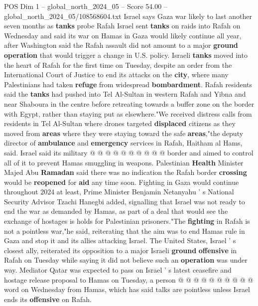 \begin{textsample}{POS Dim 1 – global\_north\_2024\_05 – Score 54.00 – global\_north\_2024\_05/108568604.txt}  \label{ex:f1_pos_271}
Israel says Gaza war likely to last another seven months as \textbf{tanks} probe Rafah Israel sent \textbf{tanks} on raids into Rafah on Wednesday and said its war on Hamas in Gaza would likely continue all year, after Washington said the Rafah assault did not amount to a major \textbf{ground} \textbf{operation} that would trigger a change in U.S. policy.
Israeli \textbf{tanks} moved into the heart of Rafah for the first time on Tuesday, despite an order from the International Court of Justice to end its attacks on the \textbf{city}, where many Palestinians had taken \textbf{refuge} from widespread \textbf{bombardment}.
Rafah residents said the \textbf{tanks} had pushed into Tel Al-Sultan in western Rafah and Yibna and near Shaboura in the centre before retreating towards a buffer zone on the border with Egypt, rather than staying put as elsewhere."We received distress calls from residents in Tel Al-Sultan where drones targeted \textbf{displaced} citizens as they moved from \textbf{areas} where they were staying toward the safe \textbf{areas},"the deputy director of \textbf{ambulance} and \textbf{emergency} services in Rafah, Haitham al Hams, said.
Israel said its military @ @ @ @ @ @ @ @ @ @ border and aimed to control all of it to prevent Hamas smuggling in weapons.
Palestinian \textbf{Health} Minister Majed Abu \textbf{Ramadan} said there was no indication the Rafah border \textbf{crossing} would be \textbf{reopened} for \textbf{aid} any time soon.
Fighting in Gaza would continue throughout 2024 at least, Prime Minister Benjamin Netanyahu ' s National Security Advisor Tzachi Hanegbi added, signalling that Israel was not ready to end the war as demanded by Hamas, as part of a deal that would see the exchange of hostages is holds for Palestinian prisoners."The \textbf{fighting} in Rafah is not a pointless war,"he said, reiterating that the aim was to end Hamas rule in Gaza and stop it and its allies attacking Israel.
The United States, Israel ' s closest ally, reiterated its opposition to a major Israeli \textbf{ground} \textbf{offensive} in Rafah on Tuesday while saying it did not believe such an \textbf{operation} was under way.
Mediator Qatar was expected to pass on Israel ' s latest ceasefire and hostage release proposal to Hamas on Tuesday, a person @ @ @ @ @ @ @ @ @ @ word on Wednesday from Hamas, which has said talks are pointless unless Israel ends its \textbf{offensive} on Rafah.

\end{textsample}
